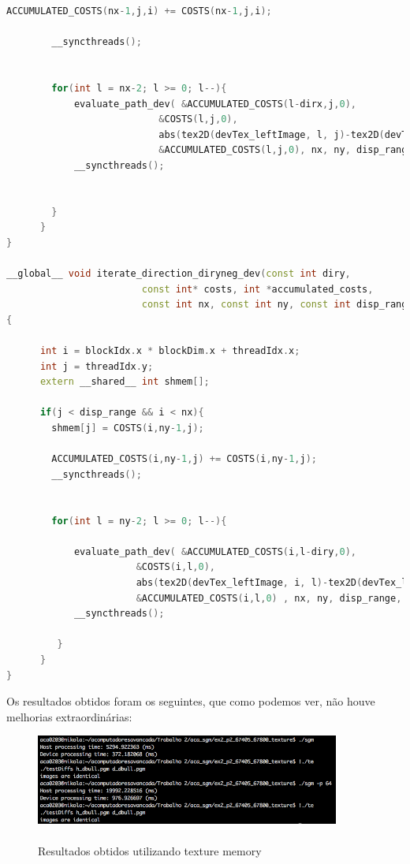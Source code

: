 \documentclass[pdftex,12pt,a4paper]{report}
\begin{document}
\begin{lstlisting}[language=c++, basicstyle=\scriptsize]
        ACCUMULATED_COSTS(nx-1,j,i) += COSTS(nx-1,j,i);

        __syncthreads();


        for(int l = nx-2; l >= 0; l--){
            evaluate_path_dev( &ACCUMULATED_COSTS(l-dirx,j,0),
                           &COSTS(l,j,0),
                           abs(tex2D(devTex_leftImage, l, j)-tex2D(devTex_leftImage,l-dirx,j)) ,
                           &ACCUMULATED_COSTS(l,j,0), nx, ny, disp_range, i, shmem);
            __syncthreads();


        }
      }
}

__global__ void iterate_direction_diryneg_dev(const int diry,
                        const int* costs, int *accumulated_costs,
                        const int nx, const int ny, const int disp_range )
{

      int i = blockIdx.x * blockDim.x + threadIdx.x;
      int j = threadIdx.y;
      extern __shared__ int shmem[];

      if(j < disp_range && i < nx){
        shmem[j] = COSTS(i,ny-1,j);

        ACCUMULATED_COSTS(i,ny-1,j) += COSTS(i,ny-1,j);
        __syncthreads();


        for(int l = ny-2; l >= 0; l--){

            evaluate_path_dev( &ACCUMULATED_COSTS(i,l-diry,0),
                       &COSTS(i,l,0),
                       abs(tex2D(devTex_leftImage, i, l)-tex2D(devTex_leftImage,i,l-diry)) ,
                       &ACCUMULATED_COSTS(i,l,0) , nx, ny, disp_range, j, shmem);
            __syncthreads();

         }
      }
}

\end{lstlisting} 

	
Os resultados obtidos foram os seguintes, que como podemos ver, não houve melhorias extraordinárias:

\begin{figure}[!htb]
\center
 \includegraphics[width=100mm,scale=1]{IteratePositionTexture.png}
 \caption{\\ Resultados obtidos utilizando texture memory}
 \label{fig:IteratePositionTexture}
\end{figure}
\end{document}
